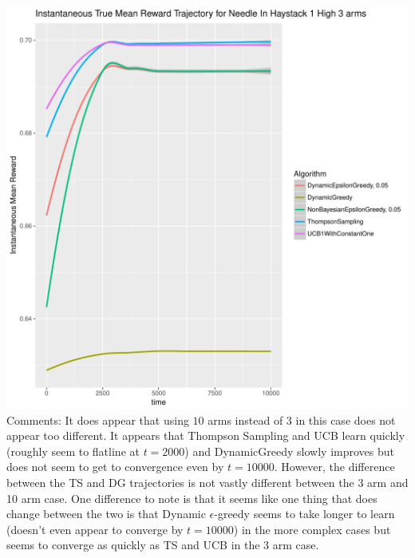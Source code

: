 \documentclass[11pt,letterpaper]{article}
\begin{document}
\includegraphics[scale=0.5]{"../results/preliminary_figures/Instantaneous True Mean Reward Trajectory for Needle In Haystack 1 High 3 arms"} \\

Comments: It does appear that using $10$ arms instead of $3$ in this case does not appear too different. It appears that Thompson Sampling and UCB learn quickly (roughly seem to flatline at $t = 2000$) and DynamicGreedy slowly improves but does not seem to get to convergence even by $t = 10000$. However, the difference between the TS and DG trajectories is not vastly different between the 3 arm and 10 arm case. One difference to note is that it seems like one thing that does change between the two is that Dynamic $\epsilon$-greedy seems to take longer to learn (doesn't even appear to converge by $t = 10000$) in the more complex cases but seems to converge as quickly as TS and UCB in the 3 arm case.
\end{document}
